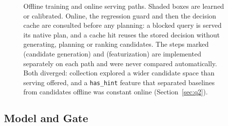 \documentclass[conference]{IEEEtran}
\begin{document}
\begin{figure}[t]
\caption{Offline training and online serving paths. Shaded boxes are learned or
calibrated. Online, the regression guard and then the decision cache are
consulted before any planning: a blocked query is served its native plan, and a
cache hit reuses the stored decision without generating, planning or ranking
candidates. The steps marked \protect{} (candidate generation) and
\protect{} (featurization) are implemented separately on each path and
were never compared automatically. Both diverged: collection explored a wider
candidate space than serving offered, and a \texttt{has\_hint} feature that
separated baselines from candidates offline was constant online
(Section~\ref{sec:q2}).}
\label{fig:pipeline}
\end{figure}

\subsection{Model and Gate}
\label{sec:gate}
\end{document}
